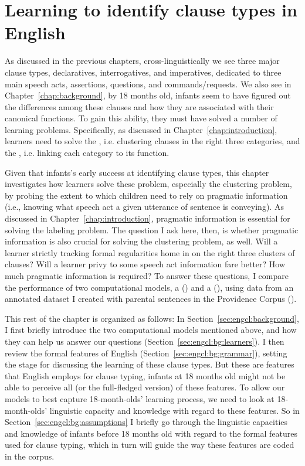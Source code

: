 \chapter{Learning to identify clause types in English}
\label{chap:eng-cl}


As discussed in the previous chapters, cross-linguistically we see three major clause types, declaratives, interrogatives, and imperatives, dedicated to three main speech acts, assertions, questions, and commands/requests. We also see in Chapter~\ref{chap:background}, by 18 months old, infants seem to have figured out the differences among these clauses and how they are associated with their canonical functions.  To gain this ability, they must have solved a number of learning problems. Specifically, as discussed in Chapter~\ref{chap:introduction}, learners need to solve the , i.e. clustering clauses in the right three categories, and the , i.e. linking each category to its function. 

Given that infants's early success at identifying clause types, this chapter investigates how learners solve these problem, especially the clustering problem, by probing the extent to which children need to rely on pragmatic information (i.e., knowing what speech act a given utterance of sentence is conveying). As discussed in Chapter~\ref{chap:introduction}, pragmatic information is essential for solving the labeling problem. The question I ask here, then, is whether pragmatic information is also crucial for solving the clustering problem, as well. Will a learner strictly tracking formal regularities home in on the right three clusters of clauses? Will a learner privy to some speech act information fare better? How much pragmatic information is required? To answer these questions, I compare the performance of two computational models, a \tbf{\distlearner{}} (\dlearnerabbr{}) and a \tbf{\praglearner{}} (\plearnerabbr{}), using data from an annotated dataset I created with parental sentences in the Providence Corpus (\cite{ProvidenceCorpus}).

This rest of the chapter is organized as follows: 
In Section~\ref{sec:engcl:background}, I first briefly introduce the two computational models mentioned above, and how they can help us answer our questions (Section~\ref{sec:engcl:bg:learners}). I then review the formal features of English \diis{} (Section~\ref{sec:engcl:bg:grammar}), setting the stage for discussing the learning of these clause types. But these are features that English employs for clause typing, infants at 18 months old might not be able to perceive all (or the full-fledged version) of these features. To allow our models to best capture 18-month-olds' learning process, we need to look at 18-month-olds' linguistic capacity and knowledge with regard to these features. So in Section~\ref{sec:engcl:bg:assumptions} I briefly go through the linguistic capacities and knowledge of infants before 18 months old with regard to the formal features used for clause typing, which in turn will guide the way these features are coded in the corpus. 

